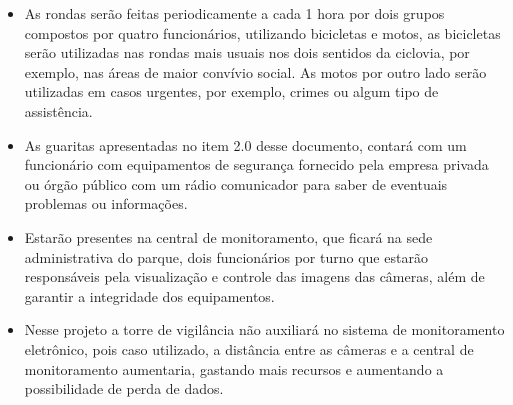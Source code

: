   	\begin{itemize}		
  	\item As rondas serão feitas periodicamente a cada 1 hora por dois grupos compostos por quatro funcionários, utilizando bicicletas e motos, as bicicletas serão utilizadas nas rondas mais usuais nos dois sentidos da ciclovia, por exemplo, nas áreas de maior convívio social. As motos por outro lado serão utilizadas em casos urgentes, por exemplo, crimes ou algum tipo de assistência.
  	
 	\item As guaritas apresentadas no item 2.0 desse documento, contará com um funcionário com equipamentos de segurança fornecido pela empresa privada ou órgão público com um rádio comunicador para saber de eventuais problemas ou informações.
 	
	\item Estarão presentes na central de monitoramento, que ficará na sede administrativa do parque, dois funcionários por turno que estarão responsáveis pela visualização e controle das imagens das câmeras, além de garantir a integridade dos equipamentos.
	
	\item Nesse projeto a torre de vigilância não auxiliará no sistema de monitoramento eletrônico, pois caso utilizado, a distância entre as câmeras e a central de monitoramento aumentaria, gastando mais recursos e aumentando a possibilidade de perda de dados.
  	\end{itemize}

